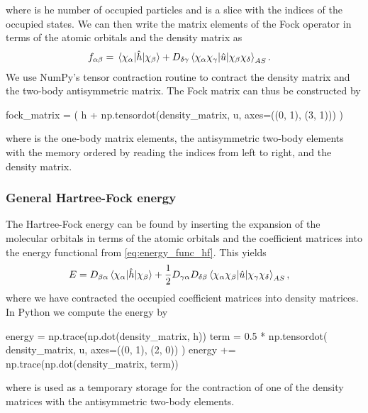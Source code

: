             where  is he number of occupied particles and  is a
            slice with the indices of the occupied states.
            We can then write the matrix elements of the Fock operator in terms
            of the atomic orbitals and the density matrix as
            \begin{align}
                f_{\alpha\beta}
                &= \mel*{\chi_{\alpha}}{\hat{h}}{\chi_{\beta}}
                +
                D_{\delta\gamma}
                \mel*{\chi_{\alpha}\chi_{\gamma}}{
                    \hat{u}
                }{\chi_{\beta}\chi_{\delta}}_{AS}.
                \label{eq:ghf-fock-matrix}
            \end{align}
            We use NumPy's tensor contraction routine  to
            contract the density matrix and the two-body antisymmetric matrix.
            The Fock matrix can thus be constructed by
            \begin{python}
fock_matrix = (
    h + np.tensordot(density_matrix, u, axes=((0, 1), (3, 1)))
)
            \end{python}
            where  is the one-body matrix elements,  the
            antisymmetric two-body elements with the memory ordered by reading
            the indices from left to right, and  the
            density matrix.

            \subsubsection{General Hartree-Fock energy}
                The Hartree-Fock energy can be found by inserting the expansion
                of the molecular orbitals in terms of the atomic orbitals and
                the coefficient matrices into the energy functional from
                \autoref{eq:energy_func_hf}.
                This yields
                \begin{align}
                    E
                    &=
                    D_{\beta\alpha}
                    \mel*{\chi_{\alpha}}{\hat{h}}{\chi_{\beta}}
                    + \frac{1}{2}
                    D_{\gamma\alpha} D_{\delta\beta}
                    \mel*{\chi_{\alpha}\chi_{\beta}}{
                        \hat{u}
                    }{\chi_{\gamma}\chi_{\delta}}_{AS},
                    \label{eq:general-hartree-fock-energy}
                \end{align}
                where we have contracted the occupied coefficient matrices into
                density matrices.
                In Python we compute the energy by
                \begin{python}
energy = np.trace(np.dot(density_matrix, h))
term = 0.5 * np.tensordot(
    density_matrix, u, axes=((0, 1), (2, 0))
)
energy += np.trace(np.dot(density_matrix, term))
                \end{python}
                where  is used as a temporary storage for the
                contraction of one of the density matrices with the
                antisymmetric two-body elements.


